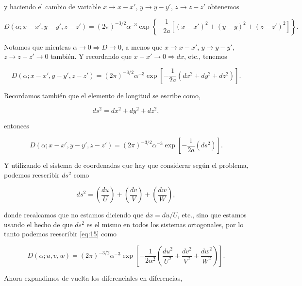 \documentclass[a4paper,10pt]{article}
\numberwithin{equation}{section}
\begin{document}
y haciendo el cambio de variable $x \rightarrow x-x'$, $y \rightarrow y-y'$, 
$z \rightarrow z-z'$ obtenemos 

\begin{equation*}
 D(\alpha;x-x',y-y',z-z') = (2\pi)^{-3/2}\alpha^{-3}
 \exp\left\{-\frac{1}{2a}[(x-x')^2 + (y-y)^2 + (z-z')^2] \right\}.
\end{equation*}

Notamos que mientras $\alpha \rightarrow 0 \Rightarrow D \rightarrow 0$, a 
menos que  $x \rightarrow x-x'$, $y \rightarrow y-y'$, $z \rightarrow z-z' 
\rightarrow 0$ también. Y recordando que $x-x' \rightarrow 0 \Rightarrow dx$, etc., 
tenemos 

\begin{equation}
 D(\alpha;x-x',y-y',z-z') = (2\pi)^{-3/2}\alpha^{-3}
 \exp\left[-\frac{1}{2a}(dx^2 + dy^2 + dz^2) \right].
\end{equation}

Recordamos también que el elemento de longitud se escribe como, 

\begin{equation}
 ds^2 = dx^2 + dy^2 + dz^2,
\end{equation}

entonces 

\begin{equation}
 D(\alpha;x-x',y-y',z-z') = (2\pi)^{-3/2}\alpha^{-3}
 \exp\left[-\frac{1}{2a}(ds^2) \right].
 \label{eq:15}
\end{equation}

Y utilizando el sistema de coordenadas que hay que considerar según el problema, 
podemos reescribir $ds^2$ como 

\begin{equation}
 ds^2 = \left(\frac{du}{U}\right) + \left(\frac{dv}{V}\right) + 
 \left(\frac{dw}{W}\right),
\end{equation}

donde recalcamos que no estamos diciendo que $dx = du/U$, etc., sino que estamos 
usando el hecho de que $ds^2$ es el mismo en todos los sistemas ortogonales, 
por lo tanto podemos reescribir \eqref{eq:15} como 

\begin{equation}
 D(\alpha;u,v,w) = (2\pi)^{-3/2}\alpha^{-3}
 \exp\left[-\frac{1}{2\alpha^2}\left(\frac{du^2}{U^2} + 
 \frac{dv^2}{V^2} + \frac{dw^2}{W^2}\right) \right].
\end{equation}

Ahora expandimos de vuelta los diferenciales en diferencias, 
\end{document}
